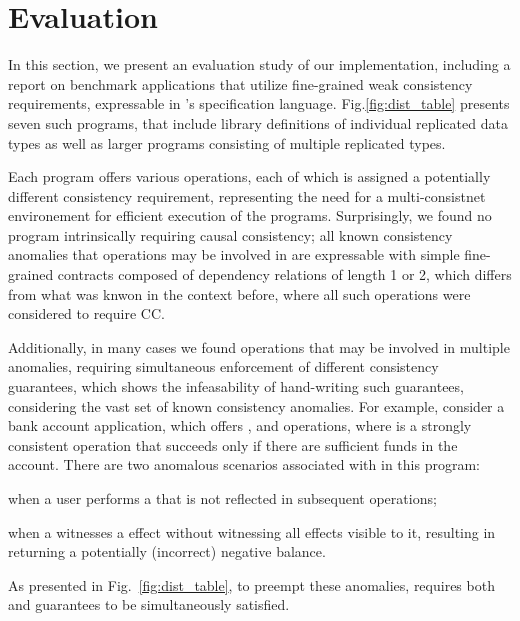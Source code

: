 \newpage
\section{Evaluation}
\label{sec:eval}
%

In this section, we present an evaluation study of our implementation,
including a report on
benchmark applications that utilize fine-grained weak consistency
requirements, expressable
in \tool's specification language.
Fig.\ref{fig:dist_table} presents seven such programs, that include
library definitions of individual replicated data types as well as larger programs consisting of multiple
replicated types. 

Each program offers various operations, each of which is assigned a
potentially different consistency requirement,
representing the need for a multi-consistnet environement for
efficient execution of the programs. Surprisingly, we found no program
intrinsically requiring causal consistency; all known consistency anomalies that operations
may be involved in are expressable with simple fine-grained contracts
composed of
dependency relations of length 1 or 2,
which differs from what was knwon in the context before, where all such
operations were considered to require CC.

Additionally, in many cases we found operations that may be involved in
multiple anomalies, requiring simultaneous enforcement of different
consistency guarantees, which shows the infeasability of hand-writing
such guarantees, considering the vast set of known consistency
anomalies. 
%
For example, consider a bank account application, which offers
\dRV{}, \wdRV{} and \gbRV{} operations, where \wdRV{} is a
strongly consistent operation that succeeds only if there are sufficient
funds in the account. There are two anomalous scenarios associated with
\gbRV{} in this program:
\begin{enumerate*}[label=(\roman*)]
\item when a user performs a \dRV{} that is not reflected
in subsequent \gbRV{} operations;
\item when a \gbRV{} witnesses a \wdRV{} effect without witnessing all
\dRV{} effects visible to it,  resulting in \gbRV{} returning a
potentially (incorrect) negative balance.
\end{enumerate*}
As presented in Fig.~\ref{fig:dist_table}, to preempt
these anomalies, \gbRV{} requires
both \rmwCTRT{} and \visCTRT{} guarantees to be simultaneously satisfied.


